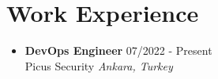 \documentclass[a4paper,10pt]{article}
\newcommand{\resumeSubheading}[4]{
  \vspace{-2pt}\item
    \textbf{#1} \hfill #2 \\
    {#3} \hfill \textit{#4} \vspace{-5pt}
}
\begin{document}
\section*{Work Experience}
\begin{itemize}[leftmargin=0.5cm]
        
    
    \resumeSubheading
        {DevOps Engineer}{07/2022 - Present}
        {Picus Security}{Ankara, Turkey}


\end{itemize}
\end{document}
